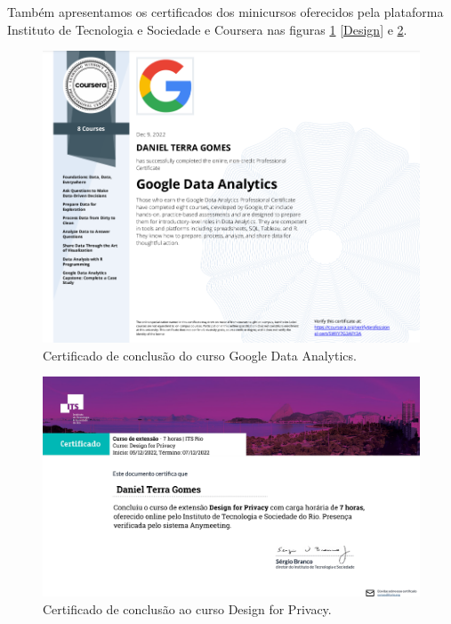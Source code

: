 Também apresentamos os certificados dos minicursos oferecidos pela plataforma Instituto de Tecnologia e Sociedade e Coursera nas figuras \ref{Google} \ref{Design} e \ref{Direitos}.


\begin{figure}[H]
\centering
\includegraphics[width=\textwidth]{Figures/google.png}
\caption{Certificado de conclusão do curso Google Data Analytics.}
\label{Google}
\end{figure}

\begin{figure}[H]
\centering
\includegraphics[width=\textwidth]{Figures/its2.pdf}
\caption{Certificado de conclusão ao curso Design for Privacy.}
\label{Direitos}
\end{figure}

